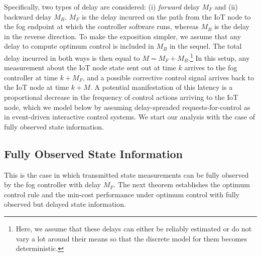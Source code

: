 \documentclass[10pt, journal, letterpaper]{IEEEtran}
\newcommand{\1}{\ensuremath{\mathbf{1}}} %
\begin{document}
Specifically, two types of delay are considered: (i) {\em forward} delay $M_F$ and (ii) backward delay $M_B$. $M_F$ is the delay incurred on the path from the IoT node to the fog endpoint at which the controller software runs, whereas $M_B$ is the delay in the reverse direction. To make the exposition simpler, we assume that any delay to compute optimum control is included in $M_B$ in the sequel.  The total delay incurred in both ways is then equal to $M = M_F + M_B$.\footnote{Here, we assume that these delays can either be reliably estimated or do not vary a lot around their means so that the discrete model for them becomes deterministic.} In this setup, any measurement about the IoT node state sent out at time $k$ arrives to the fog controller at time $k + M_F$, and a possible corrective control signal arrives back to the IoT node at time $k + M$. A potential  manifestation of this latency is a proportional decrease in the frequency of control actions arriving to the IoT node, which we model below by assuming delay-spreaded requests-for-control as in event-driven interactive control systems. We start our analysis with the case of fully observed state information.

\subsection{Fully Observed State Information}
This is the case in which transmitted state measurements can be fully observed by the fog controller with delay $M_F$. The next theorem establishes the optimum control rule and the min-cost performance under optimum control with fully observed but delayed state information.
\end{document}
